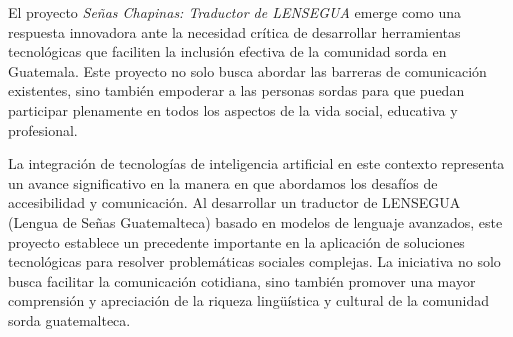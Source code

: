 El proyecto \textit{Señas Chapinas: Traductor de LENSEGUA} emerge como una respuesta innovadora ante la necesidad crítica de desarrollar herramientas tecnológicas que faciliten la inclusión efectiva de la comunidad sorda en Guatemala. Este proyecto no solo busca abordar las barreras de comunicación existentes, sino también empoderar a las personas sordas para que puedan participar plenamente en todos los aspectos de la vida social, educativa y profesional.

La integración de tecnologías de inteligencia artificial en este contexto representa un avance significativo en la manera en que abordamos los desafíos de accesibilidad y comunicación. Al desarrollar un traductor de LENSEGUA (Lengua de Señas Guatemalteca) basado en modelos de lenguaje avanzados, este proyecto establece un precedente importante en la aplicación de soluciones tecnológicas para resolver problemáticas sociales complejas. La iniciativa no solo busca facilitar la comunicación cotidiana, sino también promover una mayor comprensión y apreciación de la riqueza lingüística y cultural de la comunidad sorda guatemalteca.